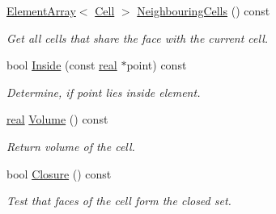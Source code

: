 \begin{DoxyCompactItemize}
\hyperlink{classINMOST_1_1ElementArray}{Element\-Array}$<$ \hyperlink{classINMOST_1_1Cell}{Cell} $>$ \hyperlink{classINMOST_1_1Cell_a47bc37b5c0fc45e2536f78787280fb4d}{Neighbouring\-Cells} () const 
\begin{DoxyCompactList}\small\item\em Get all cells that share the face with the current cell. \end{DoxyCompactList}\item 
bool \hyperlink{classINMOST_1_1Cell_a91562ae41d48c2fb99b824b7407659f5}{Inside} (const \hyperlink{classINMOST_1_1Storage_a853346784b4a5822a7fac54d8f10f805}{real} $\ast$point) const 
\begin{DoxyCompactList}\small\item\em Determine, if point lies inside element. \end{DoxyCompactList}\item 
\hyperlink{classINMOST_1_1Storage_a853346784b4a5822a7fac54d8f10f805}{real} \hyperlink{classINMOST_1_1Cell_ae0caec87803ddd108c4fb06decf69e18}{Volume} () const 
\begin{DoxyCompactList}\small\item\em Return volume of the cell. \end{DoxyCompactList}\item 
bool \hyperlink{classINMOST_1_1Cell_af07f9b3de49505cbe634c32882af2ac1}{Closure} () const 
\begin{DoxyCompactList}\small\item\em Test that faces of the cell form the closed set. \end{DoxyCompactList}\end{DoxyCompactItemize}
